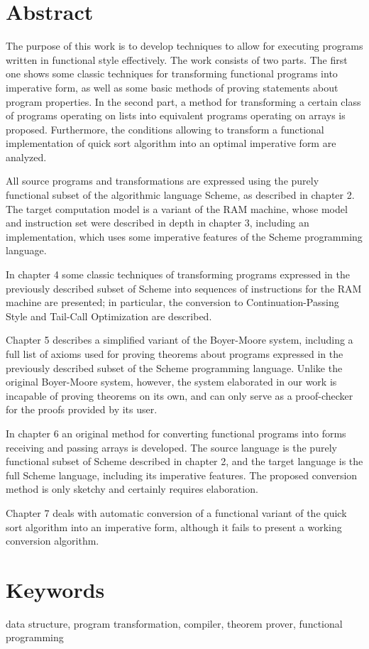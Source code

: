 \section*{Abstract}

The purpose of this work is to develop techniques to allow
for executing programs written in functional style effectively.
The work consists of two parts. The first one shows some classic
techniques for transforming functional programs into imperative form,
as well as some basic methods of proving statements about program
properties. In the second part, a method for transforming a certain
class of programs operating on lists into equivalent programs
operating on arrays is proposed. Furthermore, the conditions allowing
to transform a functional implementation of quick sort algorithm
into an optimal imperative form are analyzed.

All source programs and transformations are expressed using the
purely functional subset of the algorithmic language Scheme, as
described in chapter 2. The target computation model is a variant
of the RAM machine, whose model and instruction set were described
in depth in chapter 3, including an implementation, which uses
some imperative features of the Scheme programming language.

In chapter 4 some classic techniques of transforming programs expressed
in the previously described subset of Scheme into sequences of instructions
for the RAM machine are presented; in particular, the conversion to
Continuation-Passing Style and Tail-Call Optimization are described.

Chapter 5 describes a simplified variant of the Boyer-Moore system,
including a full list of axioms used for proving theorems about programs
expressed in the previously described subset of the Scheme programming
language. Unlike the original Boyer-Moore system, however, the system
elaborated in our work is incapable of proving theorems on its own,
and can only serve as a proof-checker for the proofs provided by its
user.

In chapter 6 an original method for converting functional programs
into forms receiving and passing arrays is developed. The source
language is the purely functional subset of Scheme described in chapter
2, and the target language is the full Scheme language, including its
imperative features. The proposed conversion method is only sketchy
and certainly requires elaboration.

Chapter 7 deals with automatic conversion of a functional variant
of the quick sort algorithm into an imperative form, although it
fails to present a working conversion algorithm.

\section*{Keywords}
data structure, program transformation, compiler, theorem prover,
functional programming
